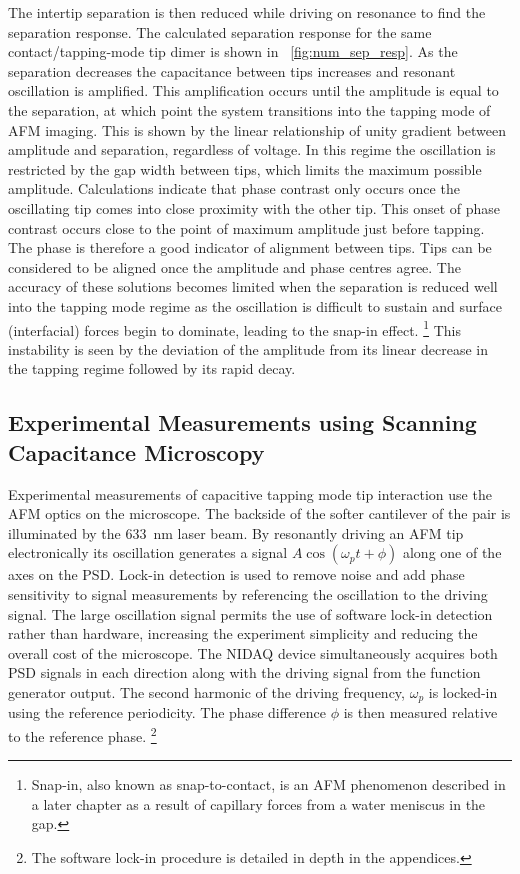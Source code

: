 \documentclass{article}
\begin{document}
The intertip separation is then reduced while driving on resonance to find the separation response. The calculated separation response for the same contact/tapping-mode tip dimer is shown in \figurename~\ref{fig:num_sep_resp}. As the separation decreases the capacitance between tips increases and resonant oscillation is amplified. This amplification occurs until the amplitude is equal to the separation, at which point the system transitions into the tapping mode of AFM imaging. This is shown by the linear relationship of unity gradient between amplitude and separation, regardless of voltage. In this regime the oscillation is restricted by the gap width between tips, which limits the maximum possible amplitude.
Calculations indicate that phase contrast only occurs once the oscillating tip comes into close proximity with the other tip. This onset of phase contrast occurs close to the point of maximum amplitude just before tapping. The phase is therefore a good indicator of alignment between tips. Tips can be considered to be aligned once the amplitude and phase centres agree. The accuracy of these solutions becomes limited when the separation is reduced well into the tapping mode regime as the oscillation is difficult to sustain and surface (interfacial) forces begin to dominate, leading to the snap-in effect.%
\footnote{Snap-in, also known as snap-to-contact, is an AFM phenomenon described in a later chapter as a result of capillary forces from a water meniscus in the gap.}
This instability is seen by the deviation of the amplitude from its linear decrease in the tapping regime followed by its rapid decay.

\FloatBarrier
\subsection{Experimental Measurements using Scanning Capacitance Microscopy}

Experimental measurements of capacitive tapping mode tip interaction use the AFM optics on the microscope. The backside of the softer cantilever of the pair is illuminated by the \SI{633}{nm} laser beam. By resonantly driving an AFM tip electronically its oscillation generates a signal $A\cos(\omega_p t + \phi)$ along one of the axes on the PSD. Lock-in detection is used to remove noise and add phase sensitivity to signal measurements by referencing the oscillation to the driving signal. The large oscillation signal permits the use of software lock-in detection rather than hardware, increasing the experiment simplicity and reducing the overall cost of the microscope. The NIDAQ device simultaneously acquires both PSD signals in each direction along with the driving signal from the function generator output. The second harmonic of the driving frequency, $\omega_p$ is locked-in using the reference periodicity. The phase difference $\phi$ is then measured relative to the reference phase.%
\footnote{The software lock-in procedure is detailed in depth in the appendices.}
\end{document}
